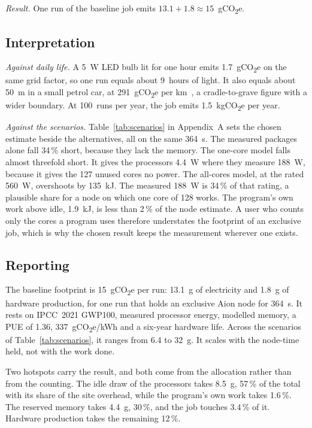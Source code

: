 \documentclass[conference,a4paper]{IEEEtran}
\begin{document}
\emph{Result.} One run of the baseline job emits
$13.1+1.8\approx15$~gCO\textsubscript{2}e.

\subsection{Interpretation}\label{sec:interpretation}
\emph{Against daily life.} A 5~W LED bulb lit for one hour emits
1.7~gCO\textsubscript{2}e on the same grid factor, so one run equals about
9~hours of light. It also equals about 50~m in a small petrol car, at
291~gCO\textsubscript{2}e per km~\cite{ries2026s2}, a cradle-to-grave figure
with a wider boundary. At 100~runs per year, the job emits
1.5~kgCO\textsubscript{2}e per year.

\emph{Against the scenarios.} Table~\ref{tab:scenarios} in Appendix~A sets the
chosen estimate beside the alternatives, all on the same 364~s. The measured
packages alone fall 34\,\% short, because they lack the memory. The one-core
model falls almost threefold short. It gives the processors 4.4~W where they
measure 188~W, because it gives the 127 unused cores no power. The all-cores
model, at the rated 560~W, overshoots by 135~kJ. The measured 188~W is 34\,\% of
that rating, a plausible share for a node on which one core of 128 works. The
program's own work above idle, 1.9~kJ, is less than 2\,\% of the node estimate.
A user who counts only the cores a program uses therefore understates the
footprint of an exclusive job, which is why the chosen result keeps the
measurement wherever one exists.

\subsection{Reporting}\label{sec:reporting}
The baseline footprint is 15~gCO\textsubscript{2}e per run: 13.1~g of
electricity and 1.8~g of hardware production, for one run that holds an
exclusive Aion node for 364~s. It rests on IPCC~2021 GWP100, measured processor
energy, modelled memory, a PUE of 1.36, 337~gCO\textsubscript{2}e/kWh and a
six-year hardware life. Across the scenarios of Table~\ref{tab:scenarios}, it
ranges from 6.4 to 32~g. It scales with the node-time held, not with the work
done.

Two hotspots carry the result, and both come from the allocation rather than
from the counting. The idle draw of the processors takes 8.5~g, 57\,\% of the
total with its share of the site overhead, while the program's own work takes
1.6\,\%. The reserved memory takes 4.4~g, 30\,\%, and the job touches 3.4\,\% of
it. Hardware production takes the remaining 12\,\%.
\end{document}
